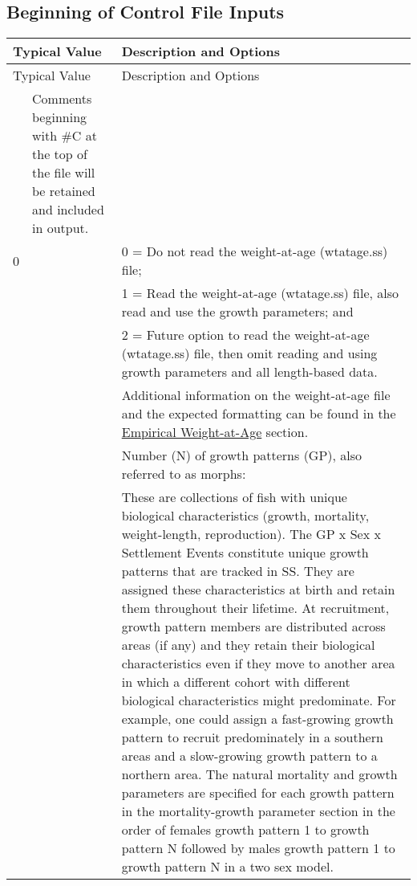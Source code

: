 \subsection{Beginning of Control File Inputs}
\begin{center}
	\begin{longtable}{p{0.5cm} p{2cm} p{12cm}}
		\hline
		\multicolumn{2}{l}{Typical Value} & Description and Options\Tstrut\Bstrut\\
		\hline
		\endfirsthead

		\hline
		\multicolumn{2}{l}{Typical Value} & Description and Options\Tstrut\Bstrut\\
		\hline
		\endhead

		\hline
		\endfoot

		\endlastfoot

		\multicolumn{2}{l}{\#C comment }\Tstrut & Comments beginning with \#C at the top of the file will be retained and included in output. \Bstrut\\
		\hline

		0 & & 0 = Do not read the weight-at-age (wtatage.ss) file; \Tstrut\\
		  & & 1 = Read the weight-at-age (wtatage.ss) file, also read and use the growth parameters; and \\
		  & & 2 = Future option to read the weight-at-age (wtatage.ss) file, then omit reading and using growth parameters and all length-based data.\\
		  & & Additional information on the weight-at-age file and the expected formatting can be found in the \hyperlink{WAA}{Empirical Weight-at-Age}  section.\Bstrut\\

		\pagebreak
		1 & & Number (N) of growth patterns (GP), also referred to as morphs:\Tstrut\\
		& & These are collections of fish with unique biological characteristics (growth, mortality, weight-length, reproduction). The GP x Sex x Settlement Events constitute unique growth patterns that are tracked in SS. They are assigned these characteristics at birth and retain them throughout their lifetime. At recruitment, growth pattern members are distributed across areas (if any) and they retain their biological characteristics even if they move to another area in which a different cohort with different biological characteristics might predominate.  For example, one could assign a fast-growing growth pattern to recruit predominately in a southern areas and a slow-growing growth pattern to a northern area. The natural mortality and growth parameters are specified for each growth pattern in the mortality-growth parameter section in the order of females growth pattern 1 to growth pattern N followed by males growth pattern 1 to growth pattern N in a two sex model.\Bstrut\\


\end{longtable}
\end{center}
